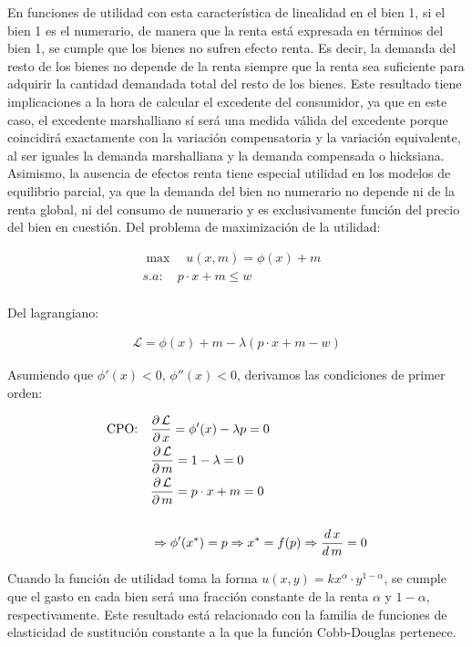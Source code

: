 \documentclass{nuevotema}
\begin{document}
En funciones de utilidad con esta característica de linealidad en el bien 1, si el bien 1 es el numerario, de manera que la renta está expresada en términos del bien 1, se cumple que los bienes no sufren efecto renta. Es decir, la demanda del resto de los bienes no depende de la renta siempre que la renta sea suficiente para adquirir la cantidad demandada total del resto de los bienes. Este resultado tiene implicaciones a la hora de calcular el excedente del consumidor, ya que en este caso, el excedente marshalliano sí será una medida válida del excedente porque coincidirá exactamente con la variación compensatoria y la variación equivalente, al ser iguales la demanda marshalliana y la demanda compensada o hicksiana. Asimismo, la ausencia de efectos renta tiene especial utilidad en los modelos de equilibrio parcial, ya que la demanda del bien no numerario no depende ni de la renta global, ni del consumo de numerario y es exclusivamente función del precio del bien en cuestión. Del problema de maximización de la utilidad:

\begin{align*}
	 \max \quad u(x,m) = \phi(x) + m & \\
	 s.a: \quad p \cdot x + m \leq w & \\
\end{align*}

Del lagrangiano:

\begin{align*}
	\mathcal{L} = \phi(x) + m - \lambda ( p \cdot x + m - w)
\end{align*}

Asumiendo que $\phi'(x) <0$, $\phi''(x) < 0$, derivamos las condiciones de primer orden:

\begin{align*}
	\text{CPO:} \quad & \dfrac{\partial \, \mathcal{L}}{\partial \, x} = \phi ' (x) - \lambda p = 0 \\
	& \dfrac{\partial \, \mathcal{L}}{\partial \, m} = 1 - \lambda = 0 \\
	& \dfrac{\partial \, \mathcal{L}}{\partial \, m} = p \cdot x + m = 0 \\ \\
	& \Rightarrow \phi'(x^*) = p \Rightarrow x^* = f(p) \Rightarrow \frac{d \, x}{d \, m} = 0 \\ 
\end{align*}



Cuando la función de utilidad toma la forma $u(x,y) =  k x^\alpha \cdot y^{1 - \alpha}$, se cumple que el gasto en cada bien será una fracción constante de la renta $\alpha$ y $1-\alpha$, respectivamente. Este resultado está relacionado con la familia de funciones de elasticidad de sustitución constante a la que la función Cobb-Douglas pertenece.
\end{document}

